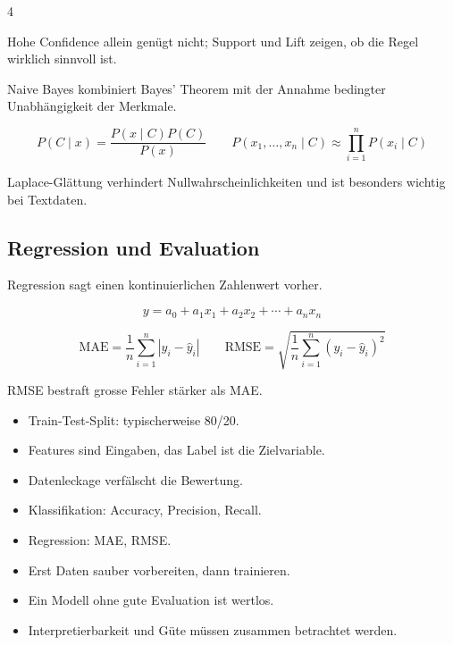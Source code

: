 \begin{landscape}
\begin{multicols*}{4}
\begin{cheatSheetBox}[title=Apriori]
Hohe Confidence allein genügt nicht; Support und Lift zeigen, ob die Regel wirklich sinnvoll ist.
\end{cheatSheetBox}

\begin{cheatSheetBox}[title=Naive Bayes]
Naive Bayes kombiniert Bayes' Theorem mit der Annahme bedingter Unabhängigkeit der Merkmale.

\[
P(C\mid x)=\frac{P(x\mid C)P(C)}{P(x)}
\qquad
P(x_1,\ldots,x_n\mid C)\approx\prod_{i=1}^{n}P(x_i\mid C)
\]

Laplace-Glättung verhindert Nullwahrscheinlichkeiten und ist besonders wichtig bei Textdaten.
\end{cheatSheetBox}

\columnbreak\textcolor{\cheatSheetColor}{\subsection*{Regression und Evaluation}}

\begin{cheatSheetBox}[title=Regression]
Regression sagt einen kontinuierlichen Zahlenwert vorher.

\[
y=a_0+a_1x_1+a_2x_2+\cdots+a_nx_n
\]

\[
\text{MAE}=\frac{1}{n}\sum_{i=1}^{n}|y_i-\hat{y}_i|
\qquad
\text{RMSE}=\sqrt{\frac{1}{n}\sum_{i=1}^{n}(y_i-\hat{y}_i)^2}
\]

RMSE bestraft grosse Fehler stärker als MAE.
\end{cheatSheetBox}

\begin{cheatSheetBox}[title=Datenvorbereitung]
\begin{itemize}
    \item Train-Test-Split: typischerweise 80/20.
    \item Features sind Eingaben, das Label ist die Zielvariable.
    \item Datenleckage verfälscht die Bewertung.
    \item Klassifikation: Accuracy, Precision, Recall.
    \item Regression: MAE, RMSE.
\end{itemize}
\end{cheatSheetBox}

\begin{cheatSheetBox}[title=Merksätze]
\begin{itemize}
    \item Erst Daten sauber vorbereiten, dann trainieren.
    \item Ein Modell ohne gute Evaluation ist wertlos.
    \item Interpretierbarkeit und Güte müssen zusammen betrachtet werden.
\end{itemize}
\end{cheatSheetBox}

\end{multicols*}
\end{landscape}
\clearpage
\restoregeometry